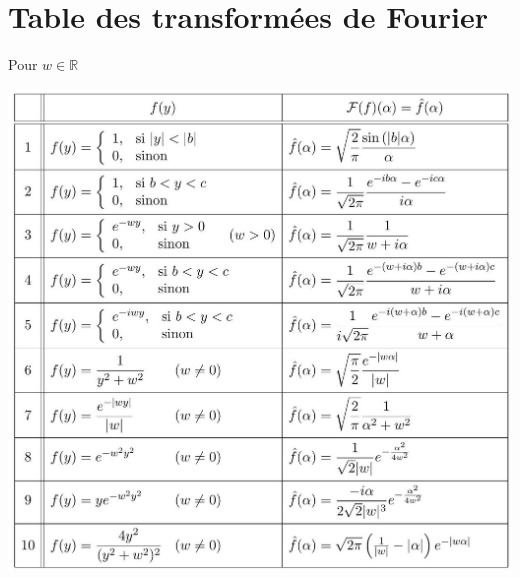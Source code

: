 \section{Table des transformées de Fourier}
Pour $w \in \mathbb{R}$
\begin{center}
\includegraphics[max width=\textwidth]{images/Table_Fourier.jpg}
\end{center}
